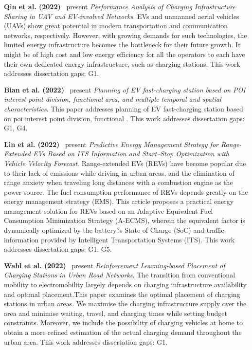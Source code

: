 \documentclass[letterpaper, 12pt, oneside, doublespacing]{Thesis}
\begin{document}
\noindent \textbf{Qin et al. (2022)}~\cite{performance_analysis_2022} present \textit{Performance Analysis of Charging Infrastructure Sharing in UAV and EV-involved Networks}. EVs and unmanned aerial vehicles (UAVs) show great potential in modern transportation and communication networks, respectively. However, with growing demands for such technologies, the limited energy infrastructure becomes the bottleneck for their future growth. It might be of high cost and low energy efficiency for all the operators to each have their own dedicated energy infrastructure, such as charging stations. This work addresses dissertation gaps: G1.



\noindent \textbf{Bian et al. (2022)}~\cite{planning_of_2022} present \textit{Planning of EV fast-charging station based on POI interest point division, functional area, and multiple temporal and spatial characteristics}. This paper addresses planning of EV fast-charging station based on poi interest point division, functional . This work addresses dissertation gaps: G1, G4.



\noindent \textbf{Lin et al. (2022)}~\cite{predictive_energy_2022} present \textit{Predictive Energy Management Strategy for Range-Extended EVs Based on ITS Information and Start--Stop Optimization with Vehicle Velocity Forecast}. Range-extended EVs (REVs) have become popular due to their lack of emissions while driving in urban areas, and the elimination of range anxiety when traveling long distances with a combustion engine as the power source. The fuel consumption performance of REVs depends greatly on the energy management strategy (EMS). This article proposes a practical energy management solution for REVs based on an Adaptive Equivalent Fuel Consumption Minimization Strategy (A-ECMS), wherein the equivalent factor is dynamically optimized by the battery?s State of Charge (SoC) and traffic information provided by Intelligent Transportation Systems (ITS). This work addresses dissertation gaps: G1, G5.



\noindent \textbf{Wahl et al. (2022)}~\cite{reinforcement_learning-based_2022} present \textit{Reinforcement Learning-based Placement of Charging Stations in Urban Road Networks}. The transition from conventional mobility to electromobility largely depends on charging infrastructure availability and optimal placement.This paper examines the optimal placement of charging stations in urban areas. We maximise the charging infrastructure supply over the area and minimise waiting, travel, and charging times while setting budget constraints. Moreover, we include the possibility of charging vehicles at home to obtain a more refined estimation of the actual charging demand throughout the urban area. This work addresses dissertation gaps: G1.
\end{document}
